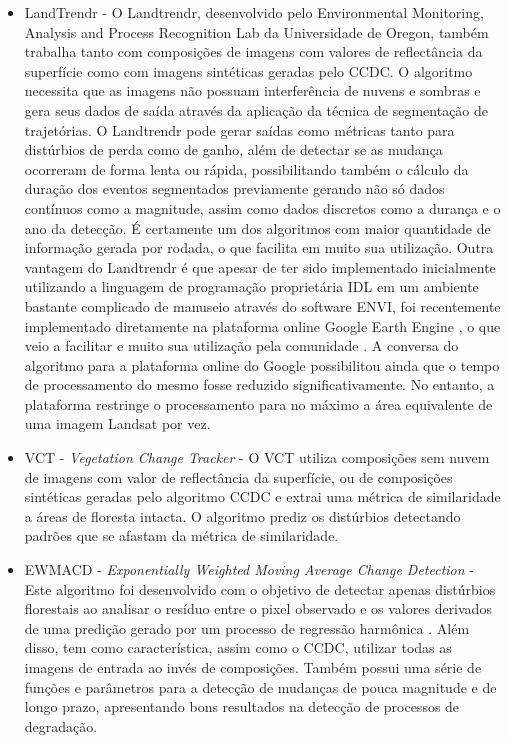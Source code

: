 \documentclass[12pt,a4paper]{article}
\begin{document}
\begin{itemize}
  \item LandTrendr \citep{KENNEDY20102897, KENNEDY2012117} - O Landtrendr, desenvolvido pelo Environmental Monitoring, Analysis and Process Recognition Lab da Universidade de Oregon, também trabalha tanto com composições de imagens com valores de reflectância da superfície como com imagens sintéticas geradas pelo CCDC. O algoritmo necessita que as imagens não possuam interferência de nuvens e sombras e gera seus dados de saída através da aplicação da técnica de segmentação de trajetórias. O Landtrendr pode gerar saídas como métricas tanto para distúrbios de perda como de ganho, além de detectar se as mudança ocorreram de forma lenta ou rápida, possibilitando também o cálculo da duração dos eventos segmentados previamente gerando não só dados contínuos como a magnitude, assim como dados discretos como a durança e o ano da detecção. É certamente um dos algoritmos com maior quantidade de informação gerada por rodada, o que facilita em muito sua utilização. Outra vantagem do Landtrendr é que apesar de ter sido implementado inicialmente utilizando a linguagem de programação proprietária IDL em um ambiente bastante complicado de manuseio através do software ENVI, foi recentemente implementado diretamente na plataforma online Google Earth Engine \citep{GORELICK201718}, o que veio a facilitar e muito sua utilização pela comunidade \citep{Kennedy2018}. A conversa do algoritmo para a plataforma online do Google possibilitou ainda que o tempo de processamento do mesmo fosse reduzido significativamente. No entanto, a plataforma restringe o processamento para no máximo a área equivalente de uma imagem Landsat por vez.
  
  \item VCT - \textit{Vegetation Change Tracker} \citep{Huang2010, THOMAS201119} - O VCT utiliza composições sem nuvem de imagens com valor de reflectância da superfície, ou de composições sintéticas geradas pelo algoritmo CCDC e extrai uma métrica de similaridade a áreas de floresta intacta. O algoritmo prediz os distúrbios detectando padrões que se afastam da métrica de similaridade.
  
  \item EWMACD - \textit{Exponentially Weighted Moving Average Change Detection} \citep{Brooks2014} - Este algoritmo foi desenvolvido com o objetivo de detectar apenas distúrbios florestais ao analisar o resíduo entre o pixel observado e os valores derivados de uma predição gerado por um processo de regressão harmônica \citep{Brooks2012}. Além disso, tem como característica, assim como o CCDC, utilizar todas as imagens de entrada ao invés de composições. Também possui uma série de funções e parâmetros para a detecção de mudanças de pouca magnitude e de longo prazo, apresentando bons resultados na detecção de processos de degradação.
  

\end{itemize}
\end{document}
